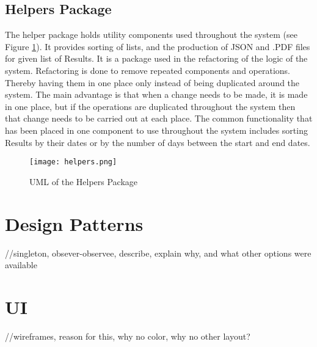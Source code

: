 \subsection{Helpers Package}
\par The helper package holds utility components used throughout the system (see Figure \ref{fig:helpers}). It provides sorting of lists, and the production of JSON and .PDF files for given list of Results. It is a package used in the refactoring of the logic of the system. Refactoring is done to remove repeated components and operations. Thereby having them in one place only instead of being duplicated around the system. The main advantage is that when a change needs to be made, it is made in one place, but if the operations are duplicated throughout the system then that change needs to be carried out at each place. The common functionality that has been placed in one component to use throughout the system includes sorting Results by their dates or by the number of days between the start and end dates.
\begin{figure}[H]
\caption{UML of the Helpers Package}
\label{fig:helpers}
\texttt{[image: helpers.png]}
\end{figure}
\section{Design Patterns}
//singleton, obsever-observee, describe, explain why, and what other options were available
\section{UI}
//wireframes, reason for this, why no color, why no other layout?











